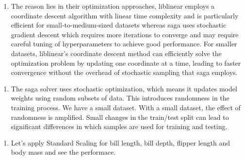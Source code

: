 \documentclass[11pt]{article}
\providecommand{\tightlist}{%
      \setlength{\itemsep}{0pt}\setlength{\parskip}{0pt}}
\begin{document}
    \begin{enumerate}
\def\labelenumi{\arabic{enumi}.}
\setcounter{enumi}{4}
\tightlist
\item
  The reason lies in their optimization approaches, liblinear employs a
  coordinate descent algorithm with linear time complexity and is
  particularly efficient for small-to-medium-sized datasets whereas saga
  uses stochastic gradient descent which requires more iterations to
  converge and may require careful tuning of hyperparameters to achieve
  good performance. For smaller datasets, liblinear's coordinate descent
  method can efficiently solve the optimization problem by updating one
  coordinate at a time, leading to faster convergence without the
  overhead of stochastic sampling that saga employs.
\end{enumerate}

    \begin{enumerate}
\def\labelenumi{\arabic{enumi}.}
\setcounter{enumi}{5}
\tightlist
\item
  The saga solver uses stochastic optimization, which means it updates
  model weights using random subsets of data. This introduces randomness
  in the training process. We have a small dataset. With a small
  dataset, the effect of randomness is amplified. Small changes in the
  train/test split can lead to significant differences in which samples
  are used for training and testing.
\end{enumerate}

    \begin{enumerate}
\def\labelenumi{\arabic{enumi}.}
\setcounter{enumi}{6}
\tightlist
\item
  Let's apply Standard Scaling for bill length, bill depth, flipper
  length and body mass and see the performace.
\end{enumerate}
\end{document}
